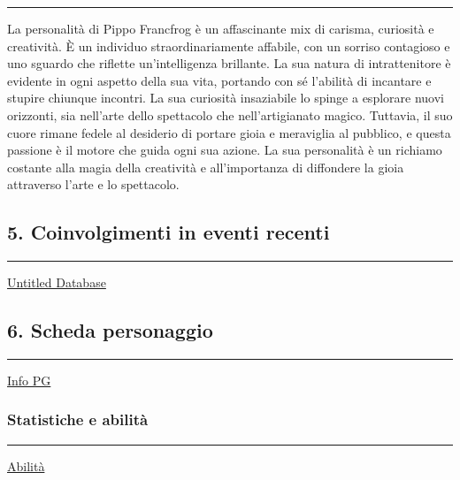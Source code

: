 \begin{center}\rule{0.5\linewidth}{0.5pt}\end{center}

La personalità di Pippo Francfrog è un affascinante mix di carisma,
curiosità e creatività. È un individuo straordinariamente affabile, con
un sorriso contagioso e uno sguardo che riflette un'intelligenza
brillante. La sua natura di intrattenitore è evidente in ogni aspetto
della sua vita, portando con sé l'abilità di incantare e stupire
chiunque incontri. La sua curiosità insaziabile lo spinge a esplorare
nuovi orizzonti, sia nell'arte dello spettacolo che nell'artigianato
magico. Tuttavia, il suo cuore rimane fedele al desiderio di portare
gioia e meraviglia al pubblico, e questa passione è il motore che guida
ogni sua azione. La sua personalità è un richiamo costante alla magia
della creatività e all'importanza di diffondere la gioia attraverso
l'arte e lo spettacolo.

\subsection{5. Coinvolgimenti in eventi
recenti}\label{coinvolgimenti-in-eventi-recenti}

\begin{center}\rule{0.5\linewidth}{0.5pt}\end{center}

\href{Untitled\%20Database\%2035b391282a354aefb762c6cbe4670abc.csv}{Untitled
Database}

\subsection{6. Scheda personaggio}\label{scheda-personaggio}

\begin{center}\rule{0.5\linewidth}{0.5pt}\end{center}

\href{Info\%20PG\%2075172870926b4488a518a676f6c59d30.csv}{Info PG}

\subsubsection{Statistiche e abilità}\label{statistiche-e-abilituxe0}

\begin{center}\rule{0.5\linewidth}{0.5pt}\end{center}

\href{Abilita\%CC\%80\%206c389f50c35f46369e8056828b53fcb0.csv}{Abilità}

